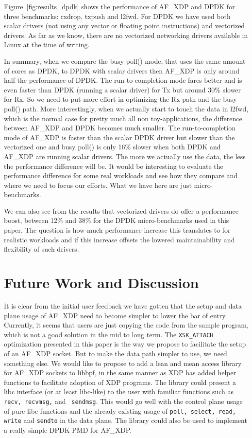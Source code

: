 \documentclass[9pt,numbers,reprint]{sigplanconf}
\begin{document}
Figure~\ref{fig:results_dpdk} shows the performance of AF\_XDP and
DPDK for three benchmarks: rxdrop, txpush and l2fwd. For DPDK we have
used both scalar drivers (not using any vector or floating point
instructions) and vectorized drivers. As far as we know, there are no
vectorized networking drivers available in Linux at the time of
writing.

In summary, when we compare the busy poll() mode, that uses the same
amount of cores as DPDK, to DPDK with scalar drivers then AF\_XDP is
only around half the performance of DPDK. The run-to-completion mode
fares better and is even faster than DPDK (running a scalar driver)
for Tx but around 30\% slower for Rx. So we need to put more effort in
optimizing the Rx path and the busy poll() path. More interestingly,
when we actually start to touch the data in l2fwd, which is the normal
case for pretty much all non toy-applications, the difference between
AF\_XDP and DPDK becomes much smaller. The run-to-completion mode of
AF\_XDP is faster than the scalar DPDK driver but slower than the
vectorized one and busy poll() is only 16\% slower when both DPDK and
AF\_XDP are running scalar drivers. The more we actually use the data,
the less the performance difference will be. It would be interesting
to evaluate the performance difference for some real workloads and see
how they compare and where we need to focus our efforts. What we have
here are just micro-benchmarks.

We can also see from the results that vectorized drivers do offer a
performance boost, between 12\% and 38\% for the DPDK micro-benchmarks
used in this paper. The question is how much performance increase this
translates to for realistic workloads and if this increase offsets the
lowered maintainability and flexibility of such drivers.


\section{Future Work and Discussion}
\label{sec:future}

It is clear from the initial user feedback we have gotten that the
setup and data plane usage of AF\_XDP need to become simpler to lower
the bar of entry. Currently, it seems that users are just copying the
code from the sample program, which is not a good solution in the mid
to long term. The {\tt XSK\_ATTACH} optimization presented in this
paper is the way we propose to facilitate the setup of an AF\_XDP
socket. But to make the data path simpler to use, we need something
else. We would like to propose to add a lean and mean access library
for AF\_XDP sockets to libbpf, in the same manner as XDP has added
helper functions to facilitate adoption of XDP programs. The library
could present a libc interface (or at least libc-like) to the user
with familiar functions such as {\tt recv, recvmsg,} and {\tt
  sendmsg}. This would go well with the control plane usage of pure
libc functions and the already existing usage of {\tt poll, select,
  read, write} and {\tt sendto} in the data plane. The library could
also be used to implement a really simple DPDK PMD for AF\_XDP.
\end{document}
